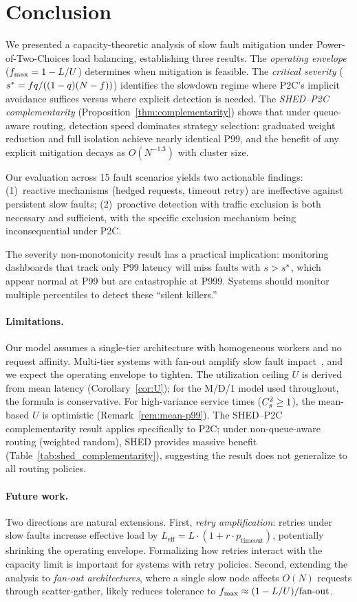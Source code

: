 \section{Conclusion}
\label{sec:conclusion}

We presented a capacity-theoretic analysis of slow fault mitigation
under Power-of-Two-Choices load balancing, establishing three results.
The \emph{operating envelope} ($f_{\max} = 1 - L/U$) determines when
mitigation is feasible. The \emph{critical severity} ($s^{*} =
fq/((1-q)(N-f))$) identifies the slowdown regime where P2C's implicit
avoidance suffices versus where explicit detection is needed. The
\emph{SHED--P2C complementarity} (Proposition~\ref{thm:complementarity}) shows that under queue-aware
routing, detection speed dominates strategy selection: graduated weight
reduction and full isolation achieve nearly identical P99, and the
benefit of any explicit mitigation decays as $O(N^{-1.3})$ with cluster
size.

Our evaluation across 15 fault scenarios yields two actionable findings:
(1)~reactive mechanisms (hedged requests, timeout retry) are ineffective
against persistent slow faults; (2)~proactive detection with traffic
exclusion is both necessary and sufficient, with the specific exclusion
mechanism being inconsequential under P2C.

The severity non-monotonicity result has a practical implication:
monitoring dashboards that track only P99 latency will miss faults with
$s > s^{*}$, which appear normal at P99 but are catastrophic at P999.
Systems should monitor multiple percentiles to detect these ``silent
killers.''

\paragraph{Limitations.}
Our model assumes a single-tier architecture with homogeneous workers
and no request affinity. Multi-tier systems with fan-out amplify slow
fault impact~\cite{dean2013tail}, and we expect the operating envelope
to tighten. The utilization ceiling $U$ is derived from mean latency
(Corollary~\ref{cor:U}); for the M/D/1 model used throughout, the
formula is conservative. For high-variance service times ($C_s^2 \geq 1$),
the mean-based $U$ is optimistic (Remark~\ref{rem:mean-p99}). The
SHED--P2C complementarity result applies specifically to P2C; under
non-queue-aware routing (weighted random), SHED provides massive benefit
(Table~\ref{tab:shed_complementarity}), suggesting the result does not
generalize to all routing policies.

\paragraph{Future work.}
Two directions are natural extensions. First, \emph{retry amplification}:
retries under slow faults increase effective load by
$L_{\text{eff}} = L \cdot (1 + r \cdot p_{\text{timeout}})$, potentially
shrinking the operating envelope. Formalizing how retries interact with
the capacity limit is important for systems with retry policies. Second,
extending the analysis to \emph{fan-out architectures}, where a single
slow node affects $O(N)$ requests through scatter-gather, likely reduces
tolerance to $f_{\max} \approx (1-L/U)/\text{fan-out}$.
